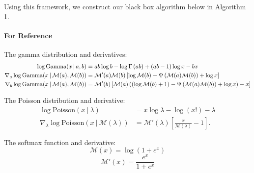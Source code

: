 Using this framework, we construct our black box algorithm below in Algorithm 1.

\paragraph{For Reference}
The gamma distribution and derivatives:
\begin{align}
\log\mbox{Gamma}(x \, | \, a,b) & = ab\log b - \log\Gamma \left(ab\right) +(ab-1)\log x - bx \label{eq:gamma}\\
\nabla_a \log\mbox{Gamma}(x \, | \, \mathcal{M}(a), \mathcal{M}(b)) &= 
\mathcal{M}'(a) \mathcal{M}(b) \left[ \log \mathcal{M}(b) - \Psi \left(\mathcal{M}(a)\mathcal{M}(b)\right) + \log x\right] \label{eq:dgammaA}
\\
\nabla_b \log\mbox{Gamma}(x \, | \, \mathcal{M}(a), \mathcal{M}(b)) &= 
\mathcal{M}'(b) \left[ \mathcal{M}(a) \left((\log \mathcal{M}(b) + 1) - \Psi \left(\mathcal{M}(a)\mathcal{M}(b)\right) + \log x\right) - x\right]\label{eq:dgammaB}
\end{align}

The Poisson distribution and derivative:
\begin{align}
\log\mbox{Poisson}(x~\vert~\lambda) &= x\log\lambda - \log(x!) - \lambda \label{eq:poisson} \\
\nabla_\lambda \log\mbox{Poisson}(x~\vert~\mathcal{M}(\lambda)) &= \mathcal{M}'(\lambda)\left[\frac{x}{\mathcal{M}(\lambda)} -1\right].\label{eq:dpoisson}
\end{align}

The softmax function and derivative:
\[\mathcal{M}(x) = \log(1+e^x)\]
\[\mathcal{M}'(x) = \frac{e^x}{1+e^x}\]


